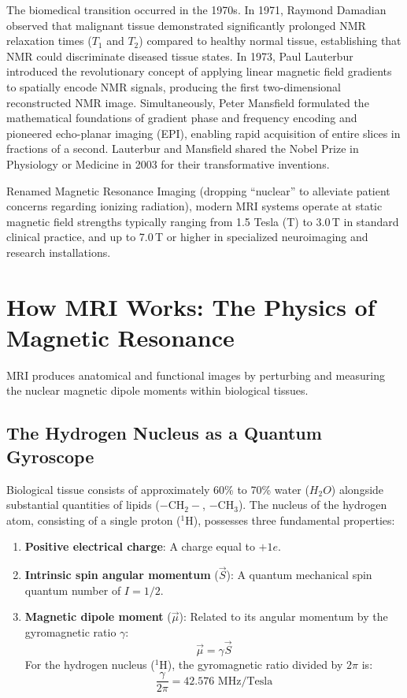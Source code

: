 \documentclass[11pt,a4paper]{article}
\begin{document}
The biomedical transition occurred in the 1970s. In 1971, Raymond Damadian observed that malignant tissue demonstrated significantly prolonged NMR relaxation times ($T_1$ and $T_2$) compared to healthy normal tissue, establishing that NMR could discriminate diseased tissue states. In 1973, Paul Lauterbur introduced the revolutionary concept of applying linear magnetic field gradients to spatially encode NMR signals, producing the first two-dimensional reconstructed NMR image. Simultaneously, Peter Mansfield formulated the mathematical foundations of gradient phase and frequency encoding and pioneered echo-planar imaging (EPI), enabling rapid acquisition of entire slices in fractions of a second. Lauterbur and Mansfield shared the Nobel Prize in Physiology or Medicine in 2003 for their transformative inventions.

Renamed Magnetic Resonance Imaging (dropping ``nuclear'' to alleviate patient concerns regarding ionizing radiation), modern MRI systems operate at static magnetic field strengths typically ranging from 1.5 Tesla (T) to 3.0\,T in standard clinical practice, and up to 7.0\,T or higher in specialized neuroimaging and research installations.

\section{How MRI Works: The Physics of Magnetic Resonance}

MRI produces anatomical and functional images by perturbing and measuring the nuclear magnetic dipole moments within biological tissues.

\subsection{The Hydrogen Nucleus as a Quantum Gyroscope}
Biological tissue consists of approximately 60\% to 70\% water ($H_2O$) alongside substantial quantities of lipids ($-\text{CH}_2-$, $-\text{CH}_3$). The nucleus of the hydrogen atom, consisting of a single proton ($^1\text{H}$), possesses three fundamental properties:
\begin{enumerate}[leftmargin=*]
    \item \textbf{Positive electrical charge}: A charge equal to $+1e$.
    \item \textbf{Intrinsic spin angular momentum} ($\vec{S}$): A quantum mechanical spin quantum number of $I = 1/2$.
    \item \textbf{Magnetic dipole moment} ($\vec{\mu}$): Related to its angular momentum by the gyromagnetic ratio $\gamma$:
    \begin{equation}
        \vec{\mu} = \gamma \vec{S}
    \end{equation}
    For the hydrogen nucleus ($^1\text{H}$), the gyromagnetic ratio divided by $2\pi$ is:
    \begin{equation}
        \frac{\gamma}{2\pi} = 42.576 \text{ MHz/Tesla}
    \end{equation}
\end{enumerate}
\end{document}
